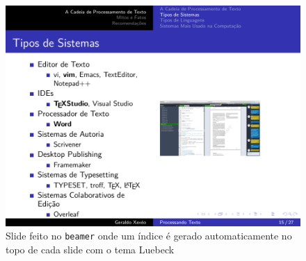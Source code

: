 \begin{figure}[tbh]
    \centering
    \includegraphics[width=\tam\linewidth,frame]{imagens/sistemas}
    \caption{Slide feito no \texttt{beamer} onde um índice é gerado automaticamente no topo de cada slide com o tema Luebeck}
    \label{fig:sistemas}
\end{figure}


